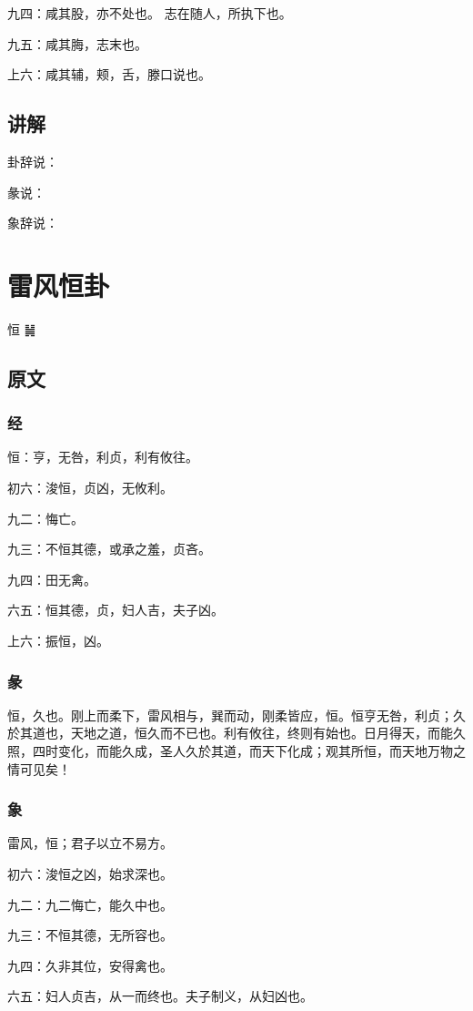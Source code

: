 \documentclass[12pt,oneside]{book}
\begin{document}
九四：咸其股，亦不处也。 志在随人，所执下也。

九五：咸其脢，志末也。

上六：咸其辅，颊，舌，滕口说也。

\section{讲解}
卦辞说：

彖说：

象辞说：

\chapter{雷风恒卦}
恒 {\Large ䷟}

\section{原文}

\subsection{经}
恒：亨，无咎，利贞，利有攸往。

初六：浚恒，贞凶，无攸利。

九二：悔亡。

九三：不恒其德，或承之羞，贞吝。

九四：田无禽。

六五：恒其德，贞，妇人吉，夫子凶。

上六：振恒，凶。

\subsection{彖}
恒，久也。刚上而柔下，雷风相与，巽而动，刚柔皆应，恒。恒亨无咎，利贞；久於其道也，天地之道，恒久而不已也。利有攸往，终则有始也。日月得天，而能久照，四时变化，而能久成，圣人久於其道，而天下化成；观其所恒，而天地万物之情可见矣！

\subsection{象}
雷风，恒；君子以立不易方。

初六：浚恒之凶，始求深也。

九二：九二悔亡，能久中也。

九三：不恒其德，无所容也。

九四：久非其位，安得禽也。

六五：妇人贞吉，从一而终也。夫子制义，从妇凶也。
\end{document}

